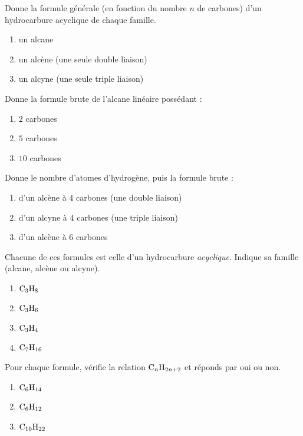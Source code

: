 \documentclass[11pt,a4paper]{article}
\begin{document}
\begin{exo}
Donne la formule générale (en fonction du nombre $n$ de carbones) d'un hydrocarbure acyclique de chaque famille.
\begin{enumerate}[label=\alph*)]
  \item un alcane
  \item un alcène (une seule double liaison)
  \item un alcyne (une seule triple liaison)
\end{enumerate}
\end{exo}

\begin{exo}
Donne la formule brute de l'alcane linéaire possédant :
\begin{enumerate}[label=\alph*)]
  \item $2$ carbones
  \item $5$ carbones
  \item $10$ carbones
\end{enumerate}
\end{exo}

\begin{exo}
Donne le nombre d'atomes d'hydrogène, puis la formule brute :
\begin{enumerate}[label=\alph*)]
  \item d'un alcène à $4$ carbones (une double liaison)
  \item d'un alcyne à $4$ carbones (une triple liaison)
  \item d'un alcène à $6$ carbones
\end{enumerate}
\end{exo}

\begin{exo}
Chacune de ces formules est celle d'un hydrocarbure \emph{acyclique}. Indique sa famille (alcane, alcène ou alcyne).
\begin{enumerate}[label=\alph*)]
  \item $\ce{C3H8}$
  \item $\ce{C3H6}$
  \item $\ce{C3H4}$
  \item $\ce{C7H16}$
\end{enumerate}
\end{exo}

\begin{exo}
Pour chaque formule, vérifie la relation $\ce{C_nH_{2n+2}}$ et réponds par oui ou non.
\begin{enumerate}[label=\alph*)]
  \item $\ce{C6H14}$
  \item $\ce{C6H12}$
  \item $\ce{C10H22}$
\end{enumerate}
\end{exo}
\end{document}

